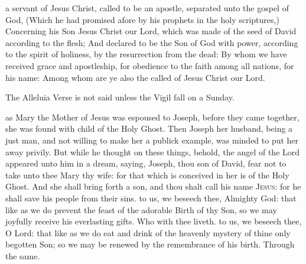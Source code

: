  a servant of Jesus Christ, called to be an apostle, separated unto the gospel of God, (Which he had promised afore by his prophets in the holy scriptures,) Concerning his Son Jesus Christ our Lord, which was made of the seed of David according to the flesh; And declared to be the Son of God with power, according to the spirit of holiness, by the resurrection from the dead: By whom we have received grace and apostleship, for obedience to the faith among all nations, for his name: Among whom are ye also the called of Jesus Christ our Lord.

\begin{rubric}
The Alleluia Verse is not said unless the Vigil fall on a Sunday.
\end{rubric}
 as Mary the Mother of Jesus was espoused to Joseph, before they came together, she was found with child of the Holy Ghost. Then Joseph her husband, being a just man, and not willing to make her a publick example, was minded to put her away privily. But while he thought on these things, behold, the angel of the Lord appeared unto him in a dream, saying, Joseph, thou son of David, fear not to take unto thee Mary thy wife: for that which is conceived in her is of the Holy Ghost. And she shall bring forth a son, and thou shalt call his name \textsc{Jesus}: for he shall save his people from their sins.
\secret
{} to us, we beseech thee, Almighty God: that like as we do prevent the feast of the adorable Birth of thy Son, so we may joyfully receive his everlasting gifts. Who with thee liveth.
\postcommunion
{} to us, we beseech thee, O Lord: that like as we do eat and drink of the heavenly mystery of thine only begotten Son; so we may be renewed by the remembrance of his birth. Through the same.

\vfill

